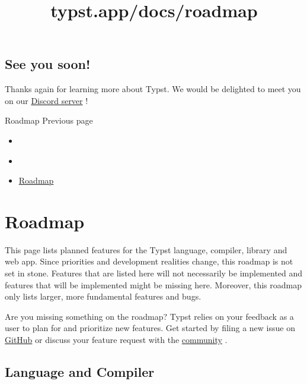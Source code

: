 \subsection{See you soon!}\label{see-you}

Thanks again for learning more about Typst. We would be delighted to
meet you on our \href{https://discord.gg/2uDybryKPe}{Discord server} !

\href{/docs/roadmap/}{\pandocbounded{}}

{ Roadmap } { Previous page }


\title{typst.app/docs/roadmap}

\begin{itemize}
\tightlist
\item
  \href{/docs}{}
\item
  
\item
  \href{/docs/roadmap/}{Roadmap}
\end{itemize}

\section{Roadmap}\label{roadmap}

This page lists planned features for the Typst language, compiler,
library and web app. Since priorities and development realities change,
this roadmap is not set in stone. Features that are listed here will not
necessarily be implemented and features that will be implemented might
be missing here. Moreover, this roadmap only lists larger, more
fundamental features and bugs.

Are you missing something on the roadmap? Typst relies on your feedback
as a user to plan for and prioritize new features. Get started by filing
a new issue on \href{https://github.com/typst/typst/issues}{GitHub} or
discuss your feature request with the
\href{https://typst.app/docs/community}{community} .

\subsection{Language and Compiler}\label{language-and-compiler}

